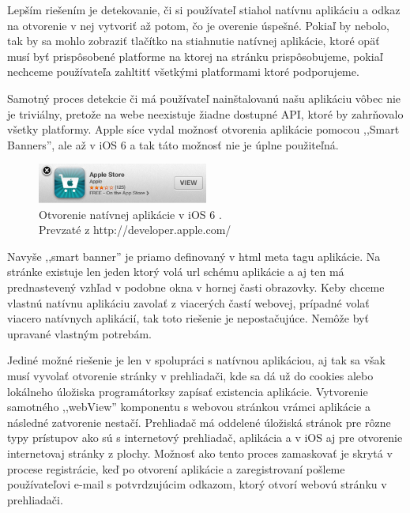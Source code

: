 Lepším riešením je detekovanie, či si používateľ stiahol natívnu aplikáciu a odkaz na otvorenie v nej vytvoriť až potom, čo je overenie úspešné. Pokiaľ by nebolo, tak by sa mohlo zobraziť tlačítko na stiahnutie natívnej aplikácie, ktoré opäť musí byť prispôsobené platforme na ktorej na stránku prispôsobujeme, pokiaľ nechceme používateľa zahltitť všetkými platformami ktoré podporujeme.

Samotný proces detekcie či má používateľ nainštalovanú našu aplikáciu vôbec nie je triviálny, pretože na webe neexistuje žiadne dostupné API, ktoré by zahrňovalo všetky platformy. Apple síce vydal možnosť otvorenia aplikácie pomocou ,,Smart Banners'', ale až v iOS 6 a tak táto možnosť nie je úplne použiteľná.

\begin{figure}[H]
	\centering
	\includegraphics[width=0.5\textwidth]{img/smartappbanner.png}
	\caption[Otvorenie natívnej aplikácie v iOS 6]{
		Otvorenie natívnej aplikácie v iOS 6 \cite{smartappbanner}.\\
		Prevzaté z http://developer.apple.com/}
	\label{fig: smartappbanner}
\end{figure}

Navyše ,,smart banner'' je priamo definovaný v html meta tagu aplikácie. Na stránke existuje len jeden ktorý volá url schému aplikácie a aj ten má prednastevený vzhľad v podobne okna v hornej časti obrazovky. Keby chceme vlastnú natívnu aplikáciu zavolať z viacerých častí webovej, prípadné volať viacero natívnych aplikácií, tak toto riešenie je nepostačujúce. Nemôže byť upravané vlastným potrebám.

Jediné možné riešenie je len v spolupráci s natívnou aplikáciou, aj tak sa však musí vyvolať otvorenie stránky v prehliadači, kde sa dá už do cookies alebo lokálneho úložiska programátorksy zapísať existencia aplikácie. Vytvorenie samotného ,,webView'' komponentu s webovou stránkou vrámci aplikácie a následné zatvorenie nestačí. Prehliadač má oddelené úložiská stránok pre rôzne typy prístupov ako sú s internetový prehliadač, aplikácia a v iOS aj pre otvorenie internetovaj stránky z plochy. Možnosť ako tento proces zamaskovať je skrytá v procese registrácie, keď po otvorení aplikácie a zaregistrovaní pošleme používateľovi e-mail s potvrdzujúcim odkazom, ktorý otvorí webovú stránku v prehliadači.



